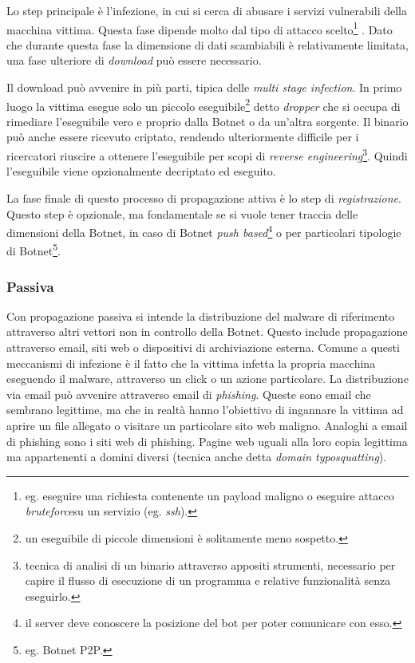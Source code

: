 Lo step principale è l'infezione, in cui si cerca di abusare i  servizi vulnerabili della macchina vittima. Questa fase dipende molto dal tipo di attacco scelto\footnote{eg. eseguire una richiesta contenente un payload maligno o eseguire attacco \textit{bruteforce}\footnotemark su un servizio (eg. \textit{ssh}).}
.
Dato che durante questa fase la dimensione di dati scambiabili è relativamente limitata, una fase ulteriore di \textit{download} può essere necessario.


\label{Download}Il download può avvenire in più parti, tipica delle \textit{multi stage infection}. In primo luogo la vittima esegue solo un piccolo eseguibile\footnote{un eseguibile di piccole dimensioni è solitamente meno sospetto.} detto \textit{dropper} che si occupa di rimediare l'eseguibile vero e proprio dalla Botnet o da un'altra sorgente. Il binario può anche essere ricevuto criptato, rendendo ulteriormente difficile per i ricercatori riuscire a ottenere l'eseguibile per scopi di \textit{reverse engineering}\footnote{tecnica di analisi di un binario attraverso appositi strumenti, necessario per capire il flusso di esecuzione di un programma e relative funzionalità senza eseguirlo.}. Quindi l'eseguibile viene opzionalmente decriptato ed eseguito.

La fase finale di questo processo di propagazione attiva è lo step di \textit{registrazione}.
Questo step è opzionale, ma fondamentale se si vuole tener traccia delle dimensioni della Botnet, in caso di Botnet \textit{push based}\footnote{il server deve conoscere la posizione del bot per poter comunicare con esso.} o per particolari tipologie di Botnet\footnote{eg. Botnet P2P.}.

\subsubsection{Passiva}
Con propagazione passiva si intende la distribuzione del malware di riferimento attraverso altri vettori non in controllo della Botnet. Questo include propagazione attraverso email, siti web o dispositivi di archiviazione esterna. Comune a questi meccanismi di infezione è il fatto che la vittima infetta la propria macchina eseguendo il malware, attraverso un click o un azione particolare. 
La distribuzione via email può avvenire attraverso email di \textit{phishing}. Queste sono email che sembrano legittime, ma che in realtà hanno l'obiettivo di ingannare la vittima ad aprire un file allegato o visitare un particolare sito web maligno. Analoghi a email di phishing sono i siti web di phishing. Pagine web uguali alla loro copia legittima ma appartenenti a domini diversi (tecnica anche detta \textit{domain typosquatting}).

